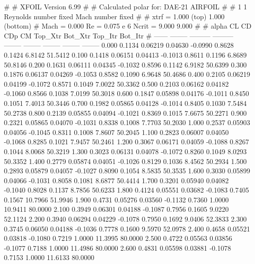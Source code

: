 #  
#       XFOIL         Version 6.99
#  
# Calculated polar for: DAE-21 AIRFOIL                                  
#  
# 1 1 Reynolds number fixed          Mach number fixed         
#  
# xtrf =   1.000 (top)        1.000 (bottom)  
# Mach =   0.000     Re =     0.075 e 6     Ncrit =   9.000  9.000
#  
#   alpha    CL        CD       CDp       CM     Top_Xtr  Bot_Xtr  Top_Itr  Bot_Itr
#  ------ -------- --------- --------- -------- -------- -------- -------- --------
   0.000   0.1134   0.06219   0.04630  -0.0990   0.8628   0.1424   6.8142  51.5412
   0.100   0.1418   0.06151   0.04413  -0.1013   0.8611   0.1196   6.8689  50.8146
   0.200   0.1631   0.06111   0.04345  -0.1032   0.8596   0.1142   6.9182  50.6399
   0.300   0.1876   0.06137   0.04269  -0.1053   0.8582   0.1090   6.9648  50.4686
   0.400   0.2105   0.06219   0.04199  -0.1072   0.8571   0.1049   7.0022  50.3362
   0.500   0.2103   0.06162   0.04182  -0.1060   0.8566   0.1038   7.0199  50.3018
   0.600   0.1847   0.05898   0.04176  -0.1011   0.8450   0.1051   7.4013  50.3446
   0.700   0.1982   0.05865   0.04128  -0.1014   0.8405   0.1030   7.5484  50.2738
   0.800   0.2139   0.05855   0.04094  -0.1021   0.8369   0.1015   7.6675  50.2271
   0.900   0.2321   0.05865   0.04070  -0.1031   0.8338   0.1008   7.7703  50.2030
   1.000   0.2537   0.05903   0.04056  -0.1045   0.8311   0.1008   7.8607  50.2045
   1.100   0.2823   0.06007   0.04050  -0.1068   0.8285   0.1021   7.9457  50.2461
   1.200   0.3067   0.06171   0.04059  -0.1088   0.8267   0.1044   8.0068  50.3219
   1.300   0.3023   0.06131   0.04078  -0.1072   0.8260   0.1049   8.0293  50.3352
   1.400   0.2779   0.05874   0.04051  -0.1026   0.8129   0.1036   8.4562  50.2934
   1.500   0.2893   0.05879   0.04057  -0.1027   0.8090   0.1054   8.5835  50.3535
   1.600   0.3030   0.05899   0.04066  -0.1031   0.8058   0.1081   8.6877  50.4414
   1.700   0.3201   0.05940   0.04082  -0.1040   0.8028   0.1137   8.7856  50.6233
   1.800   0.4124   0.05551   0.03682  -0.1083   0.7405   0.1567  10.7966  51.9946
   1.900   0.4731   0.05276   0.03560  -0.1132   0.7360   1.0000  10.9411  80.0000
   2.100   0.3949   0.06301   0.04188  -0.1087   0.7956   0.1605   9.0220  52.1124
   2.200   0.3940   0.06294   0.04229  -0.1078   0.7950   0.1692   9.0406  52.3833
   2.300   0.3745   0.06050   0.04188  -0.1036   0.7778   0.1600   9.5970  52.0978
   2.400   0.4658   0.05521   0.03818  -0.1080   0.7219   1.0000  11.3995  80.0000
   2.500   0.4722   0.05563   0.03856  -0.1077   0.7188   1.0000  11.4986  80.0000
   2.600   0.4831   0.05598   0.03881  -0.1078   0.7153   1.0000  11.6133  80.0000
